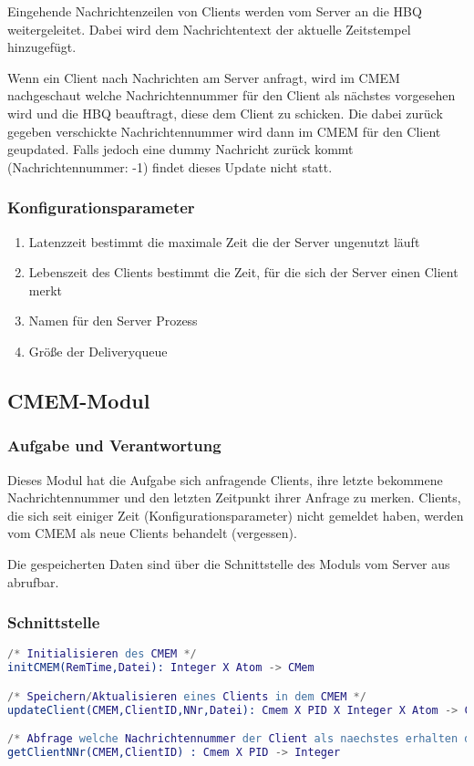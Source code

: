 \documentclass{article}
\begin{document}
Eingehende Nachrichtenzeilen von Clients werden vom Server an die HBQ weitergeleitet. Dabei wird dem Nachrichtentext der
aktuelle Zeitstempel hinzugefügt.

Wenn ein Client nach Nachrichten am Server anfragt, wird im CMEM nachgeschaut welche Nachrichtennummer für den Client
als nächstes vorgesehen wird und die HBQ beauftragt, diese dem Client zu schicken. Die dabei zurück gegeben verschickte
Nachrichtennummer wird dann im CMEM für den Client geupdated. Falls jedoch eine dummy Nachricht zurück kommt
(Nachrichtennummer: -1) findet dieses Update nicht statt.
			
\subsubsection{Konfigurationsparameter}
\begin{enumerate}
    \item{Latenzzeit bestimmt die maximale Zeit die der Server ungenutzt läuft}
    \item{Lebenszeit des Clients bestimmt die Zeit, für die sich der Server einen Client merkt}
    \item{Namen für den Server Prozess}
    \item{Größe der Deliveryqueue}
\end{enumerate}

\newpage

\subsection{CMEM-Modul}
\subsubsection{Aufgabe und Verantwortung}
Dieses Modul hat die Aufgabe sich anfragende Clients, ihre letzte bekommene Nachrichtennummer und den letzten Zeitpunkt ihrer Anfrage zu merken.
Clients, die sich seit einiger Zeit (Konfigurationsparameter) nicht gemeldet haben, werden vom CMEM als neue Clients behandelt (vergessen).

Die gespeicherten Daten sind über die Schnittstelle des Moduls vom Server aus abrufbar.

\subsubsection{Schnittstelle}
\begin{lstlisting}[language=erlang]
/* Initialisieren des CMEM */
initCMEM(RemTime,Datei): Integer X Atom -> CMem

/* Speichern/Aktualisieren eines Clients in dem CMEM */
updateClient(CMEM,ClientID,NNr,Datei): Cmem X PID X Integer X Atom -> CMem

/* Abfrage welche Nachrichtennummer der Client als naechstes erhalten darf */
getClientNNr(CMEM,ClientID) : Cmem X PID -> Integer
\end{lstlisting}
\end{document}

